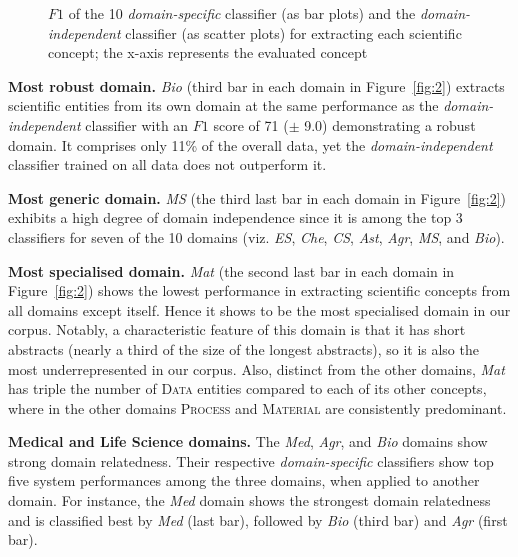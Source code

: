 \documentclass[runningheads]{llncs}
\begin{document}
\begin{figure}[htb]
    \caption{$F1$ of the 10 \textit{domain-specific} classifier (as bar plots) and the \textit{domain-independent} classifier (as scatter plots) for extracting each scientific concept; the x-axis represents the evaluated concept }
    \label{fig:3}
\end{figure}



\textbf{Most robust domain.} \textit{Bio} (third bar in each domain in Figure~\ref{fig:2}) extracts scientific entities from its own domain at the same performance as the \textit{domain-independent} classifier with an $F1$ score of 71 ($\pm$ 9.0) demonstrating a robust domain. It comprises only 11\% of the overall data, yet the \textit{domain-independent} classifier trained on all data does not outperform it.

\textbf{Most generic domain.} \textit{MS} (the third last bar in each domain in Figure~\ref{fig:2}) exhibits a high degree of domain independence since it is among the top 3 classifiers for seven of the 10 domains (viz. \textit{ES}, \textit{Che}, \textit{CS}, \textit{Ast}, \textit{Agr}, \textit{MS}, and \textit{Bio}).

\textbf{Most specialised domain.} \textit{Mat} (the second last bar in each domain in Figure~\ref{fig:2}) shows the lowest performance in extracting scientific concepts from all domains except itself. Hence it shows to be the most specialised domain in our corpus. Notably, a characteristic feature of this domain is that it has short abstracts (nearly a third of the size of the longest abstracts), so it is also the most underrepresented in our corpus. Also, distinct from the other domains, \textit{Mat} has triple the number of \textsc{Data} entities compared to each of its other concepts, where in the other domains \textsc{Process} and \textsc{Material} are consistently predominant.

\textbf{Medical and Life Science domains.}
The \textit{Med}, \textit{Agr}, and \textit{Bio} domains
show strong domain relatedness. Their respective \textit{domain-specific} classifiers show top five system performances among the three domains, when applied to another domain. For instance, the \textit{Med} domain shows the strongest domain relatedness and is classified best by \textit{Med} (last bar), followed by \textit{Bio} (third bar) and \textit{Agr} (first bar).
\end{document}
